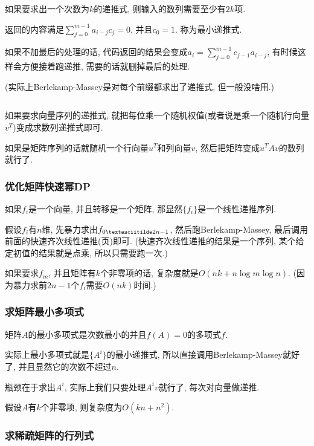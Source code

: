 如果要求出一个次数为$k$的递推式, 则输入的数列需要至少有$2k$项.

返回的内容满足$\sum_{j = 0} ^ {m - 1} a_{i - j} c_j = 0$, 并且$c_0 = 1$. 称为最小递推式.

如果不加最后的处理的话, 代码返回的结果会变成$a_i = \sum_{j = 0} ^ {m - 1} c_{j - 1} a_{i - j}$, 有时候这样会方便接着跑递推, 需要的话就删掉最后的处理.

(实际上Berlekamp-Massey是对每个前缀都求出了递推式, 但一般没啥用.)

\inputminted{cpp}{../src/math/Berlekamp-Massey.cpp}

如果要求向量序列的递推式, 就把每位乘一个随机权值(或者说是乘一个随机行向量$v^T$)变成求数列递推式即可.

如果是矩阵序列的话就随机一个行向量$u^T$和列向量$v$, 然后把矩阵变成$u^T A v$的数列就行了.

\label{BerlekampMasseyApplication}

\subsubsection{优化矩阵快速幂DP}

	如果$f_i$是一个向量, 并且转移是一个矩阵, 那显然$\{f_i\}$是一个线性递推序列.

	假设$f_i$有$n$维, 先暴力求出$f_{0\textasciitilde 2n - 1}$, 然后跑Berlekamp-Massey, 最后调用前面的快速齐次线性递推(\pageref{LinearRecurrence}页)即可. (快速齐次线性递推的结果是一个序列, 某个给定初值的结果就是点乘, 所以只需要跑一次.)

	如果要求$f_m$, 并且矩阵有$k$个非零项的话, 复杂度就是$O(nk + n\log m\log n)$. (因为暴力求前$2n-1$个$f_i$需要$O(nk)$时间.)

\subsubsection{求矩阵最小多项式}

	矩阵$A$的最小多项式是次数最小的并且$f(A) = 0$的多项式$f$.

	实际上最小多项式就是$\{A^i\}$的最小递推式, 所以直接调用Berlekamp-Massey就好了, 并且显然它的次数不超过$n$.

	瓶颈在于求出$A^i$, 实际上我们只要处理$A^i v$就行了, 每次对向量做递推.
	
	假设$A$有$k$个非零项, 则复杂度为$O(kn + n^2)$.

\subsubsection{求稀疏矩阵的行列式}

